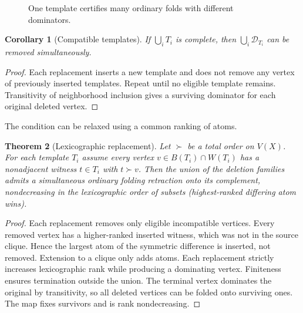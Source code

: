 \documentclass[11pt,a4paper]{article}
\newtheorem{theorem}{Theorem}[section]
\newtheorem{corollary}[theorem]{Corollary}
\theoremstyle{definition}\newtheorem{definition}[theorem]{Definition}\newtheorem{example}[theorem]{Example}
\theoremstyle{remark}\newtheorem{remark}[theorem]{Remark}
\newcommand{\D}{\mathcal D}
\begin{document}
\begin{figure}[ht]\centering
{}
\caption{One template certifies many ordinary folds with different dominators.}\end{figure}
\begin{corollary}[Compatible templates]
If \(\bigcup_iT_i\) is complete, then \(\bigcup_i\D_{T_i}\) can be removed simultaneously.
\end{corollary}
\begin{proof}
Each replacement inserts a new template and does not remove any vertex of previously inserted templates. Repeat until no eligible template remains. Transitivity of neighborhood inclusion gives a surviving dominator for each original deleted vertex.
\end{proof}
The condition can be relaxed using a common ranking of atoms.
\begin{theorem}[Lexicographic replacement]\label{thm:rank}
Let \(\succ\) be a total order on \(V(X)\). For each template \(T_i\) assume every vertex \(v\in B(T_i)\cap W(T_i)\) has a nonadjacent witness \(t\in T_i\) with \(t\succ v\). Then the union of the deletion families admits a simultaneous ordinary folding retraction onto its complement, nondecreasing in the lexicographic order of subsets (highest-ranked differing atom wins).
\end{theorem}
\begin{proof}
Each replacement removes only eligible incompatible vertices. Every removed vertex has a higher-ranked inserted witness, which was not in the source clique. Hence the largest atom of the symmetric difference is inserted, not removed. Extension to a clique only adds atoms. Each replacement strictly increases lexicographic rank while producing a dominating vertex. Finiteness ensures termination outside the union. The terminal vertex dominates the original by transitivity, so all deleted vertices can be folded onto surviving ones. The map fixes survivors and is rank nondecreasing.
\end{proof}
\end{document}
